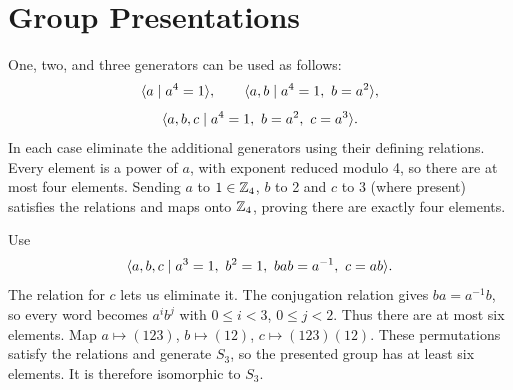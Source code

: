 \section{Group Presentations}

One, two, and three generators can be used as follows:
\[
\langle a\mid a^4=1\rangle,\qquad
\langle a,b\mid a^4=1,\ b=a^2\rangle,
\]
\[
\langle a,b,c\mid a^4=1,\ b=a^2,\ c=a^3\rangle.
\]
In each case eliminate the additional generators using their defining relations. Every element is a power of $a$, with exponent reduced modulo 4, so there are at most four elements. Sending $a$ to $1\in\mathbb{Z}_4$, $b$ to 2 and $c$ to 3 (where present) satisfies the relations and maps onto $\mathbb{Z}_4$, proving there are exactly four elements.

Use
\[
\gen{a,b,c\mid a^3=1,\ b^2=1,\ bab=a^{-1},\ c=ab}.
\]
The relation for $c$ lets us eliminate it. The conjugation relation gives $ba=a^{-1}b$, so every word becomes $a^ib^j$ with $0\le i<3$, $0\le j<2$. Thus there are at most six elements.
Map $a\mapsto(123)$, $b\mapsto(12)$, $c\mapsto(123)(12)$. These permutations satisfy the relations and generate $S_3$, so the presented group has at least six elements. It is therefore isomorphic to $S_3$.

